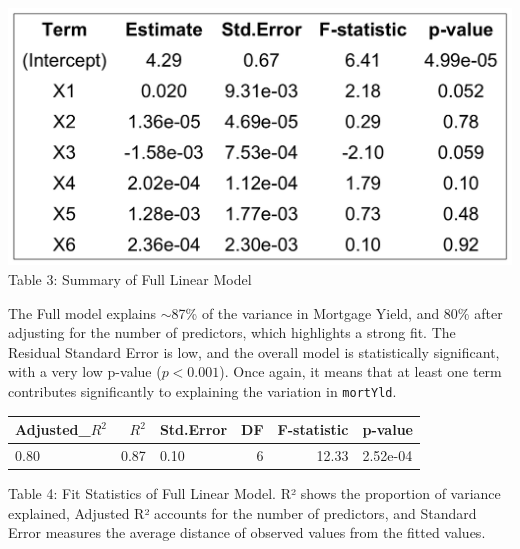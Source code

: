 \documentclass[
  12pt,
]{article}
\begin{document}
\begin{minipage}{0.42\textwidth}
\includegraphics[width=1\linewidth]{figures/full_model_summary_table.png}
\vspace{-0.1em}
{\fontsize{12}{14}\selectfont Table 3: Summary of Full Linear Model}
\end{minipage}
\hfill
\begin{minipage}{0.55\textwidth}
The Full model explains $\sim$87\% of the variance in Mortgage Yield, and 80\% after adjusting for the number of predictors, which highlights a strong fit. The Residual Standard Error is low, and the overall model is statistically significant, with a very low p-value ($p < 0.001$). Once again, it means that at least one term contributes significantly to explaining the variation in \texttt{mortYld}.
\end{minipage}

\noindent \vspace{-0.4em}

\begin{table}[!h]
\centering\begingroup\fontsize{8}{10}\selectfont

\begin{tabular}{lrlrrl}
\toprule
Adjusted\_$R^{2}$ & $R^2$ & Std.Error & DF & F-statistic & p-value\\
\midrule
0.80 & 0.87 & 0.10 & 6 & 12.33 & 2.52e-04\\
\bottomrule
\end{tabular}
\endgroup{}
\end{table}

\noindent \fontsize{12}{14}\selectfont Table 4: Fit Statistics of Full
Linear Model. R² shows the proportion of variance explained, Adjusted R²
accounts for the number of predictors, and Standard Error measures the
average distance of observed values from the fitted values.

\par
\end{document}
